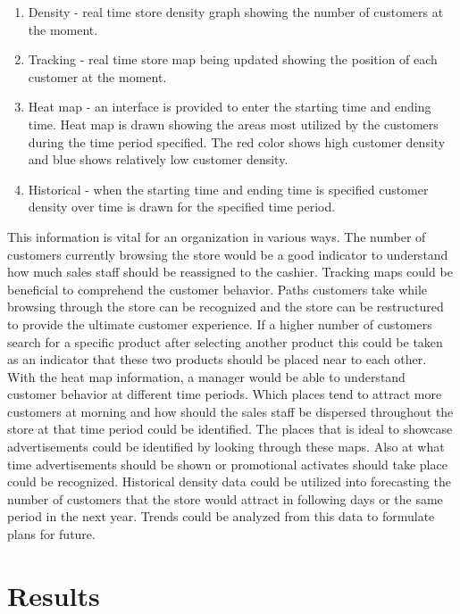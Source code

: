 \documentclass[12pt,a4paper]{report}
\begin{document}
\begin{enumerate}

\item Density - real time store density graph showing the number of customers at the moment.
\item Tracking - real time store map being updated showing the position of each customer at the moment.

\item Heat map - an interface is provided to enter the starting time and ending time. Heat map is drawn showing the areas most utilized by the customers during the time period specified. The red color shows high customer density and blue shows relatively low customer density.

\item Historical - when the starting time and ending time is specified customer density over time is drawn for the specified time period. 

\end{enumerate}

This information is vital for an organization in various ways. The number of customers currently browsing the store would be a good indicator to understand how much sales staff should be reassigned to the cashier. Tracking maps could be beneficial to comprehend the customer behavior. Paths customers take while browsing through the store can be recognized and the store can be restructured to provide the ultimate customer experience. If a higher number of customers search for a specific product after selecting another product this could be taken as an indicator that these two products should be placed near to each other. With the heat map information, a manager would be able to understand customer behavior at different time periods. Which places tend to attract more customers at morning and how should the sales staff be dispersed throughout the store at that time period could be identified. The places that is ideal to showcase advertisements could be identified by looking through these maps. Also at what time advertisements should be shown or promotional activates should take place could be recognized. Historical density data could be utilized into forecasting the number of customers that the store would attract in following days or the same period in the next year. Trends could be analyzed from this data to formulate plans for future. 

\chapter{Results}
\end{document}
